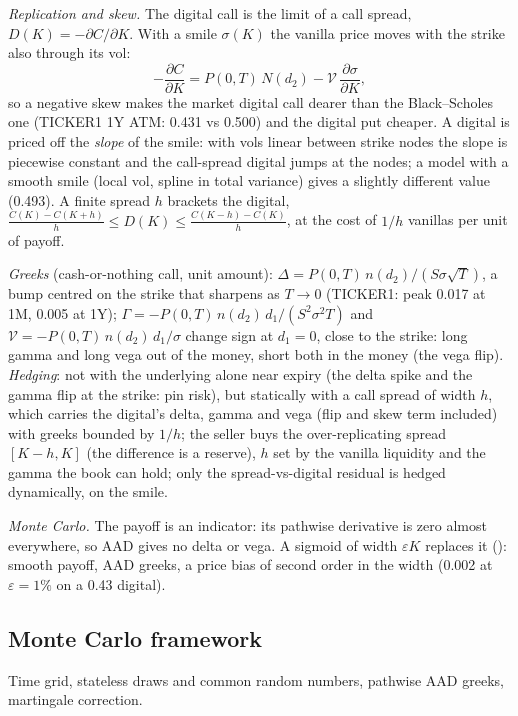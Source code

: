 \emph{Replication and skew.} The digital call is the limit of a call spread, $D(K) = -\partial C/\partial K$. With a smile
$\sigma(K)$ the vanilla price moves with the strike also through its vol:
\[
  -\frac{\partial C}{\partial K} = P(0,T)\,N(d_2) - \mathcal{V}\,\frac{\partial\sigma}{\partial K},
\]
so a negative skew makes the market digital call dearer than the Black--Scholes one (TICKER1 1Y ATM: 0.431 vs 0.500)
and the digital put cheaper. A digital is priced off the \emph{slope} of the smile: with vols linear between strike
nodes the slope is piecewise constant and the call-spread digital jumps at the nodes; a model with a smooth smile
(local vol, spline in total variance) gives a slightly different value (0.493). A finite spread $h$ brackets the digital,
$\frac{C(K) - C(K+h)}{h} \le D(K) \le \frac{C(K-h) - C(K)}{h}$, at the cost of $1/h$ vanillas per unit of payoff.

\emph{Greeks} (cash-or-nothing call, unit amount):
$\Delta = P(0,T)\,n(d_2)/(S\sigma\sqrt T)$, a bump centred on the strike that sharpens as $T \to 0$ (TICKER1: peak 0.017 at
1M, 0.005 at 1Y); $\Gamma = -P(0,T)\,n(d_2)\,d_1/(S^2\sigma^2 T)$ and $\mathcal{V} = -P(0,T)\,n(d_2)\,d_1/\sigma$ change sign at
$d_1 = 0$, close to the strike: long gamma and long vega out of the money, short both in the money (the vega flip).
\emph{Hedging}: not with the underlying alone near expiry (the delta spike and the gamma flip at the strike: pin
risk), but statically with a call spread of width $h$, which carries the digital's delta, gamma and vega (flip and skew
term included) with greeks bounded by $1/h$; the seller buys the over-replicating spread $[K - h, K]$ (the difference is a
reserve), $h$ set by the vanilla liquidity and the gamma the book can hold; only the spread-vs-digital residual is
hedged dynamically, on the smile.

\emph{Monte Carlo.} The payoff is an indicator: its pathwise derivative is zero almost everywhere, so AAD gives no
delta or vega. A sigmoid of width $\varepsilon K$ replaces it (): smooth payoff, AAD greeks, a
price bias of second order in the width (0.002 at $\varepsilon = 1\%$ on a 0.43 digital).

\subsection{Monte Carlo framework}\label{sec:mp-mc}
Time grid, stateless draws and common random numbers, pathwise AAD greeks, martingale correction.

